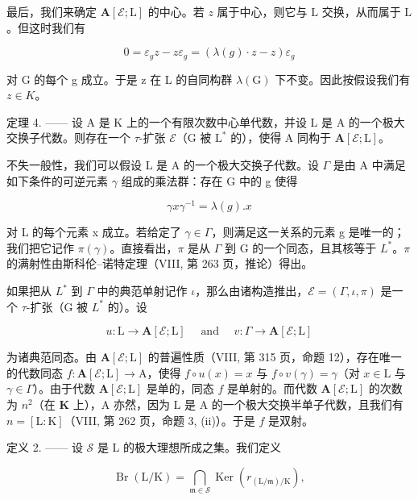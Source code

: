 最后，我们来确定 \(\mathbf{A}[\mathcal{E};\mathrm{L}]\) 的中心。若 \(z\) 属于中心，则它与 \(\mathrm{L}\) 交换，从而属于 \(\mathrm{L}\)。但这时我们有

\[
0 = \varepsilon_ {g} z - z \varepsilon_ {g} = (\lambda (g) \cdot z - z) \varepsilon_ {g}
\]

对 G 的每个 g 成立。于是 z 在 L 的自同构群 \(\lambda(\mathrm{G})\) 下不变。因此按假设我们有 \(z \in K\)。

定理 4. —— 设 A 是 K 上的一个有限次数中心单代数，并设 L 是 A 的一个极大交换子代数。则存在一个 \(\tau\)-扩张 \(\mathcal{E}\)（G 被 \(\mathrm{L}^*\) 的），使得 A 同构于 \(\mathbf{A}[\mathcal{E};\mathrm{L}]\)。

不失一般性，我们可以假设 L 是 A 的一个极大交换子代数。设 \(\Gamma\) 是由 A 中满足如下条件的可逆元素 \(\gamma\) 组成的乘法群：存在 G 中的 g 使得

\[
\gamma x \gamma^ {- 1} = \lambda (g). x\tag{42}
\]

对 L 的每个元素 x 成立。若给定了 \(\gamma \in \Gamma\)，则满足这一关系的元素 g 是唯一的；我们把它记作 \(\pi(\gamma)\)。直接看出，\(\pi\) 是从 \(\Gamma\) 到 G 的一个同态，且其核等于 \(L^{*}\)。\(\pi\) 的满射性由斯科伦--诺特定理（VIII, 第 263 页，推论）得出。

如果把从 \(L^{*}\) 到 \(\Gamma\) 中的典范单射记作 \(\iota\)，那么由诸构造推出，\(\mathcal{E} = (\Gamma, \iota, \pi)\) 是一个 \(\tau\)-扩张（G 被 \(L^{*}\) 的）。设

\[
u: \mathrm{L} \to \mathbf {A} [ \mathcal {E}; \mathrm{L} ] \quad \text { and } \quad v: \Gamma \to \mathbf {A} [ \mathcal {E}; \mathrm{L} ]
\]

为诸典范同态。由 \(\mathbf{A}[\mathcal{E};\mathrm{L}]\) 的普遍性质（VIII, 第 315 页，命题 12），存在唯一的代数同态 \(f:\mathbf{A}[\mathcal{E};\mathrm{L}]\to \mathrm{A}\)，使得 \(f\circ u(x) = x\) 与 \(f\circ v(\gamma) = \gamma\)（对 \(x\in \mathrm{L}\) 与 \(\gamma \in \Gamma\)）。由于代数 \(\mathbf{A}[\mathcal{E};\mathrm{L}]\) 是单的，同态 \(f\) 是单射的。而代数 \(\mathbf{A}[\mathcal{E};\mathrm{L}]\) 的次数为 \(n^2\)（在 \(\mathbf{K}\) 上），\(\mathrm{A}\) 亦然，因为 \(\mathrm{L}\) 是 \(\mathrm{A}\) 的一个极大交换半单子代数，且我们有 \(n = [\mathrm{L}:\mathrm{K}]\)（VIII, 第 262 页，命题 3, (ii)）。于是 \(f\) 是双射。

定义 2. —— 设 \(\mathscr{S}\) 是 L 的极大理想所成之集。我们定义

\[
\operatorname{Br} (\mathrm{L} / \mathrm{K}) = \bigcap_ {\mathfrak {m} \in \mathscr {S}} \operatorname{Ker} (r _ {(\mathrm{L} / \mathfrak {m}) / \mathrm{K}}),
\]

